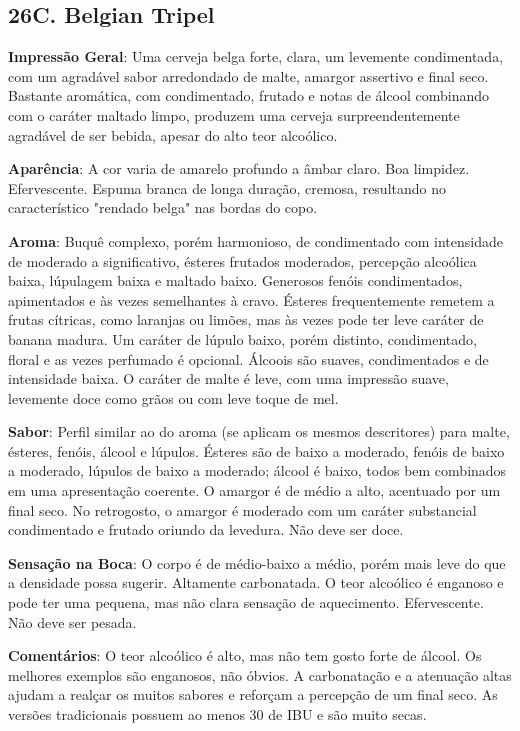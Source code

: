 \subsection*{26C. Belgian Tripel}

\textbf{Impressão Geral}: Uma cerveja belga forte, clara, um levemente condimentada, com um agradável sabor arredondado de malte, amargor assertivo e final seco. Bastante aromática, com condimentado, frutado e notas de álcool combinando com o caráter maltado limpo, produzem uma cerveja surpreendentemente agradável de ser bebida, apesar do alto teor alcoólico.

\textbf{Aparência}: A cor varia de amarelo profundo a âmbar claro. Boa limpidez. Efervescente. Espuma branca de longa duração, cremosa, resultando no característico "rendado belga" nas bordas do copo.

\textbf{Aroma}: Buquê complexo, porém harmonioso, de condimentado com intensidade de moderado a significativo, ésteres frutados moderados, percepção alcoólica baixa, lúpulagem baixa e maltado baixo. Generosos fenóis condimentados, apimentados e às vezes semelhantes à cravo. Ésteres frequentemente remetem a frutas cítricas, como laranjas ou limões, mas às vezes pode ter leve caráter de banana madura. Um caráter de lúpulo baixo, porém distinto, condimentado, floral e as vezes perfumado é opcional. Álcoois são suaves, condimentados e de intensidade baixa. O caráter de malte é leve, com uma impressão suave, levemente doce como grãos ou com leve toque de mel.

\textbf{Sabor}: Perfil similar ao do aroma (se aplicam os mesmos descritores) para malte, ésteres, fenóis, álcool e lúpulos. Ésteres são de baixo a moderado, fenóis de baixo a moderado, lúpulos de baixo a moderado; álcool é baixo, todos bem combinados em uma apresentação coerente. O amargor é de médio a alto, acentuado por um final seco. No retrogosto, o amargor é moderado com um caráter substancial condimentado e frutado oriundo da levedura. Não deve ser doce.

\textbf{Sensação na Boca}: O corpo é de médio-baixo a médio, porém mais leve do que a densidade possa sugerir. Altamente carbonatada. O teor alcoólico é enganoso e pode ter uma pequena, mas não clara sensação de aquecimento. Efervescente. Não deve ser pesada.

\textbf{Comentários}: O teor alcoólico é alto, mas não tem gosto forte de álcool. Os melhores exemplos são enganosos, não óbvios. A carbonatação e a atenuação altas ajudam a realçar os muitos sabores e reforçam a percepção de um final seco. As versões tradicionais possuem ao menos 30 de IBU e são muito secas.

